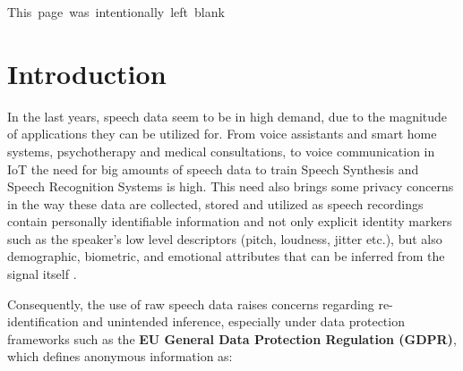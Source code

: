 \documentclass[12pt,leqno,a4paper]{article}
\begin{document}

\clearpage
\newpage
\thispagestyle{empty}
\mbox{This page was intentionally left blank}

\newpage
\section{Introduction} In the last years, speech data seem to be in high demand, due to the magnitude of applications they can be utilized for. 
From voice assistants and smart home systems, psychotherapy and medical consultations, to voice communication in IoT \citep{meyer2025usecasesvoiceanonymization} 
the need for big amounts of speech data to train Speech Synthesis and Speech Recognition Systems is high. 
This need also brings some privacy concerns in the way these data are collected, stored and utilized as speech recordings contain personally 
identifiable information and not only explicit identity markers such as the speaker’s low level descriptors (pitch, loudness, jitter etc.), 
but also demographic, biometric, and emotional attributes that can be inferred from the signal itself \citep{nautsch20_interspeech}.

Consequently, the use of raw speech data raises concerns regarding re-identification and unintended inference, 
especially under data protection frameworks such as the \textbf{EU General Data Protection Regulation (GDPR)}, which defines anonymous information as: 
\end{document}
